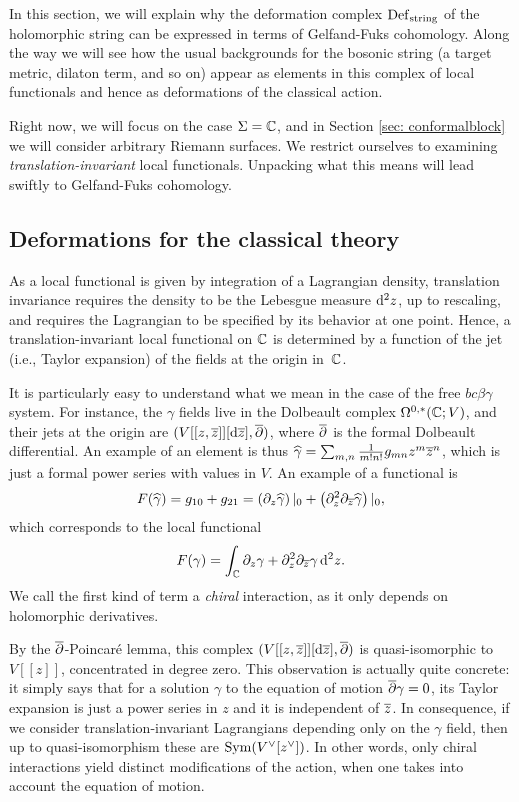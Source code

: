 In this section, we will explain why the deformation complex ${\rm Def}_{\rm string}$ of the holomorphic string 
can be expressed in terms of Gelfand-Fuks cohomology. 
Along the way we will see how the usual backgrounds for the bosonic string (a target metric, dilaton term, and so on) appear as elements in this complex of local functionals and hence as deformations of the classical action. 

Right now, we will focus on the case $\Sigma = \mathbb C$, 
and in Section \ref{sec: conformalblock} we will consider arbitrary Riemann surfaces.
We restrict ourselves to examining {\em translation-invariant} local functionals.
Unpacking what this means will lead swiftly to Gelfand-Fuks cohomology.

\subsection{Deformations for the classical theory}

As a local functional is given by integration of a Lagrangian density,
translation invariance requires the density to be the Lebesgue measure ${\rm d}^2 z$, up to rescaling,  
and requires the Lagrangian to be specified by its behavior at one point.
Hence, a translation-invariant local functional on $\mathbb C$ is determined by a function of the jet (i.e., Taylor expansion) of the fields at the origin in~$\mathbb C$. 

It is particularly easy to understand what we mean in the case of the free $bc\beta\gamma$ system.
For instance, the $\gamma$ fields live in the Dolbeault complex $\Omega^{0,*}(\mathbb C ; V)$,
and their jets at the origin are $(V [[z,\overline{z}]] [{\rm d} \overline{z}] , \overline{\partial})$,
where $\overline{\partial}$ is the formal Dolbeault differential. 
An example of an element is thus $\widehat{\gamma} = \sum_{m,n} \frac{1}{m!n!}g_{mn} z^m \overline{z}^n$,
which is just a formal power series with values in $V$.
An example of a functional is
\[
F(\widehat{\gamma}) = g_{10} + g_{21} = \left( \partial_z \widehat{\gamma}\right)|_0 + \left( \partial_z^2 \partial_{\overline{z}} \widehat{\gamma}\right)|_0,
\]
which corresponds to the local functional
\[
F(\gamma) = \int_\mathbb C \partial_z \gamma + \partial_z^2 \partial_{\overline{z}} {\gamma}\,{\rm d}^2 z.
\]
We call the first kind of term a {\em chiral} interaction, as it only depends on holomorphic derivatives.

By the $\overline{\partial}$-Poincar\'{e} lemma, 
this complex $(V [[z,\overline{z}]] [{\rm d} \overline{z}] , \overline{\partial})$ is quasi-isomorphic to $V[[z]]$, concentrated in degree zero. 
This observation is actually quite concrete:
it simply says that for a solution $\gamma$ to the equation of motion $\overline{\partial} \gamma = 0$, 
its Taylor expansion is just a power series in $z$ and it is independent of $\overline{z}$.
In consequence, if we consider translation-invariant Lagrangians depending only on the $\gamma$ field, then up to quasi-isomorphism these are ${\rm Sym}(V^\vee[z^\vee])$.
In other words, only chiral interactions yield distinct modifications of the action,
when one takes into account the equation of motion.

